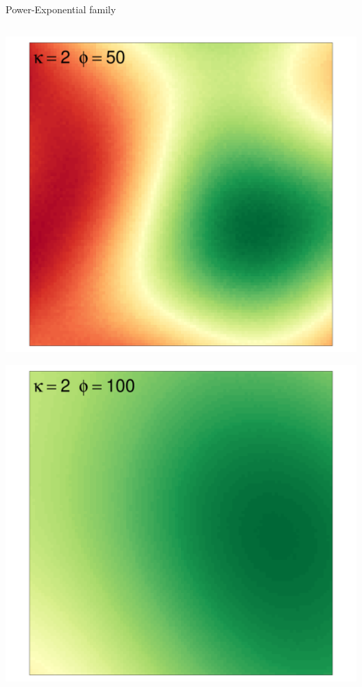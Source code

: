 \documentclass[
  ignorenonframetext,
]{beamer}
\begin{document}
\begin{frame}{Power-Exponential family}
\begin{columns}[T]
\begin{column}{0.33\textwidth}
\includegraphics{Lecture_1_files/figure-beamer/unnamed-chunk-22-1.pdf}

\includegraphics{Lecture_1_files/figure-beamer/unnamed-chunk-23-1.pdf}
\end{column}
\end{columns}
\end{frame}
\end{document}
